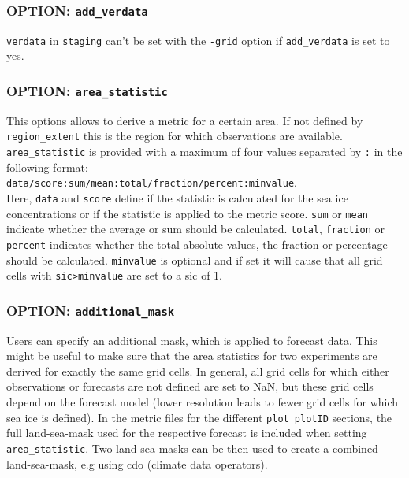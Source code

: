 \documentclass[DIV=10, parskip=full]{scrreprt}
\begin{document}
\subsubsection{OPTION: \texttt{add\_verdata}}
\texttt{verdata} in \texttt{staging} can't be set with the \texttt{-grid} option if \texttt{add\_verdata} is set to yes. 

\subsubsection{OPTION: \texttt{area\_statistic}}
This options allows to derive a metric for a certain area. If not defined by \texttt{region\_extent} this is the region for which observations are available. \texttt{area\_statistic} is provided with a maximum of four values separated by \texttt{:} in the following format: \\

 \texttt{data/score:sum/mean:total/fraction/percent:minvalue}. \\
 
Here, \texttt{data} and \texttt{score} define if the statistic is calculated for the sea ice concentrations or if the statistic is applied to the metric score. \texttt{sum} or \texttt{mean} indicate whether the average or sum should be calculated. \texttt{total}, \texttt{fraction} or \texttt{percent} indicates whether the total absolute values, the fraction or percentage should be calculated. \texttt{minvalue} is optional and if set it will cause that all grid cells with \texttt{sic>minvalue} are set to a sic of 1.     

\subsubsection{OPTION: \texttt{additional\_mask}}
Users can specify an additional mask, which is applied to forecast data. This might be useful to make sure that the area statistics for two experiments are derived for exactly the same grid cells. In general, all grid cells for which either observations or forecasts are not defined are set to NaN, but these grid cells depend on the forecast model (lower resolution leads to fewer grid cells for which sea ice is defined). In the metric files for the different \texttt{plot\_plotID} sections, the full land-sea-mask used for the respective forecast is included when setting \texttt{area\_statistic}. Two land-sea-masks can be then used to create a combined land-sea-mask, e.g using cdo (climate data operators).\\
\end{document}
